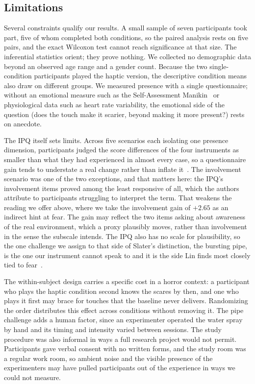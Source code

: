 
\subsection{Limitations}
\label{sec:discussion-limitations}

Several constraints qualify our results. A small sample of seven participants took part, five of whom completed both conditions, so the paired analysis rests on five pairs, and the exact Wilcoxon test cannot reach significance at that size. The inferential statistics orient; they prove nothing. We collected no demographic data beyond an observed age range and a gender count. Because the two single-condition participants played the haptic version, the descriptive condition means also draw on different groups. We measured presence with a single questionnaire; without an emotional measure such as the Self-Assessment Manikin~\cite{Bradley.1994} or physiological data such as heart rate variability, the emotional side of the question (does the touch make it scarier, beyond making it more present?) rests on anecdote. 

The IPQ itself sets limits. Across five scenarios each isolating one presence dimension, participants judged the score differences of the four instruments as smaller than what they had experienced in almost every case, so a questionnaire gain tends to understate a real change rather than inflate it~\cite{presence-questionnaires}. The involvement scenario was one of the two exceptions, and that matters here: the IPQ's involvement items proved among the least responsive of all, which the authors attribute to participants struggling to interpret the term. That weakens the reading we offer above, where we take the involvement gain of $+2.65$ as an indirect hint at fear. The gain may reflect the two items asking about awareness of the real environment, which a proxy plausibly moves, rather than involvement in the sense the subscale intends. The IPQ also has no scale for plausibility, so the one challenge we assign to that side of Slater's distinction, the bursting pipe, is the one our instrument cannot speak to and it is the side Lin finds most closely tied to fear~\cite{Lin.2017}.



The within-subject design carries a specific cost in a horror context: a participant who plays the haptic condition second knows the scares by then, and one who plays it first may brace for touches that the baseline never delivers. Randomizing the order distributes this effect across conditions without removing it. The pipe challenge adds a human factor, since an experimenter operated the water spray by hand and its timing and intensity varied between sessions. The study procedure was also informal in ways a full research project would not permit. Participants gave verbal consent with no written forms, and the study room was a regular work room, so ambient noise and the visible presence of the experimenters may have pulled participants out of the experience in ways we could not measure.

